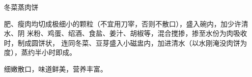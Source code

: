 \begin{recipe}{冬菜蒸肉饼}

\ingredients


\preparation

肥、瘦肉均切成极细小的颗粒（不宜用刀宰，否则不散口），盛入碗内，加少许清水、阴
米粉、鸡蛋、绍酒、食盐、姜汁、胡椒等，混合搅掺，掺至水份为肉吸收时，制成圆饼状，
连同冬菜、豆芽盛入小磁盅内，加进清水（以水刚淹没肉饼为度），蒸约半小时即成。

\features

细嫩散口，味道鲜美，营养丰富。

\end{recipe}

